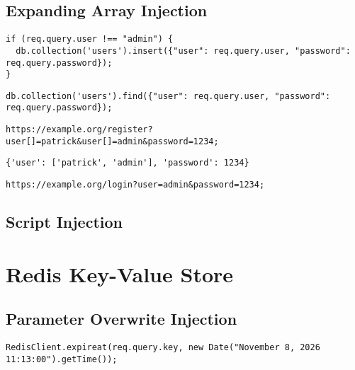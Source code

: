 \subsection{Expanding Array Injection}

\begin{lstlisting}[caption={Example for vulnerable MongoDB - NodeJS application}, label={lst:PHPArrayInjection}]
if (req.query.user !== "admin") {
  db.collection('users').insert({"user": req.query.user, "password": req.query.password});
}
\end{lstlisting}

\begin{lstlisting}[caption={Example for vulnerable MongoDB - NodeJS application}, label={lst:PHPArrayInjection}]
db.collection('users').find({"user": req.query.user, "password": req.query.password});
\end{lstlisting}

\begin{lstlisting}[caption={MongoDB injection with NodeJS's query string module}, label={lst:PHPArrayInjection}]
https://example.org/register?user[]=patrick&user[]=admin&password=1234;
\end{lstlisting}

\begin{lstlisting}[caption={Injected query parameter for MongoDB - NodeJS injection}, label={lst:PHPArrayParam}]
{'user': ['patrick', 'admin'], 'password': 1234}
\end{lstlisting}

\begin{lstlisting}[caption={MongoDB injection with NodeJS's query string module}, label={lst:PHPArrayInjection}]
https://example.org/login?user=admin&password=1234;
\end{lstlisting}

\subsection{Script Injection}




\section{Redis Key-Value Store}
\subsection{Parameter Overwrite Injection}

\begin{lstlisting}[caption={Vulnerable NodeJS example for parameter overwrite injection on Redis}, label={lst:PHPArrayInjection}]
RedisClient.expireat(req.query.key, new Date("November 8, 2026 11:13:00").getTime());
\end{lstlisting}

